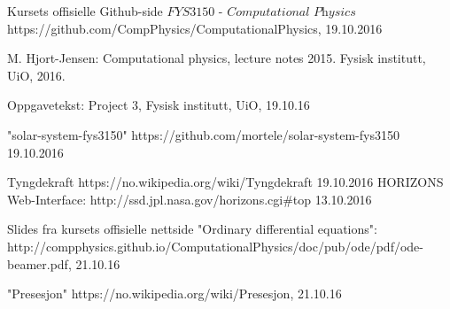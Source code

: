 \documentclass[11pt,a4paper]{article}
\begin{document}

\begin{thebibliography}{9}  

\bibitem{}
  Kursets offisielle Github-side $\textit{FYS3150 - Computational Physics}$
  https://github.com/CompPhysics/ComputationalPhysics,
  19.10.2016  
    
\bibitem{}
   M. Hjort-Jensen: Computational physics, lecture notes 2015. Fysisk institutt, UiO, 2016.

\bibitem{}
   Oppgavetekst: Project 3, Fysisk institutt, UiO, 19.10.16
   
\bibitem{}
    "solar-system-fys3150"
    https://github.com/mortele/solar-system-fys3150
    19.10.2016
    
\bibitem{}
    Tyngdekraft
    https://no.wikipedia.org/wiki/Tyngdekraft
    19.10.2016
\bibitem{}
    HORIZONS Web-Interface: http://ssd.jpl.nasa.gov/horizons.cgi$\#$top
    13.10.2016
    
\bibitem{}
  Slides fra kursets offisielle nettside
  "Ordinary differential equations":
  http://compphysics.github.io/ComputationalPhysics/doc/pub/ode/pdf/ode-beamer.pdf, 21.10.16
  
  \bibitem{}
  "Presesjon"
  https://no.wikipedia.org/wiki/Presesjon, 21.10.16
   
\end{thebibliography}
\end{document}

